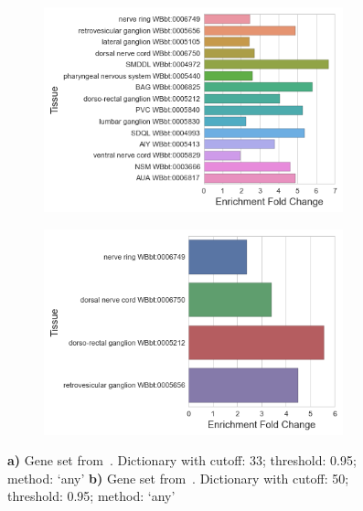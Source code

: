 \documentclass[linenumbers, doublespacing]{bmcart}
\begin{document}
\begin{backmatter}
\begin{figure}
  \begin{subfigure}[b]{0.95\textwidth}
    \includegraphics[width=0.95\textwidth]{WBPaper00024970_GABAergic_neuron_specific_WBbt_0005190_247_33cutoff.png}
    \caption{}
    \label{fig:agreement1}
  \end{subfigure}
  \begin{subfigure}[b]{0.95\textwidth} 	\includegraphics[width=0.95\textwidth]{WBPaper00037950_GABAergic-motor-neurons_larva_enriched_WBbt_0005190_132_33cutoff.png}
    \caption{}
    \label{fig:agreement2}
  \end{subfigure}
  \captionsetup{width= 0.95\textwidth}
  \caption{
  \textbf{a)} Gene set from~\cite{Watson2008a}. Dictionary with cutoff: 33; threshold: 0.95; method: `any'
  \textbf{b)} Gene set from~\cite{Spencer2011}. Dictionary with cutoff: 50; threshold: 0.95; method: `any'
   }
   \label{fig:intragree}
\end{figure}



\end{backmatter}
\end{document}
